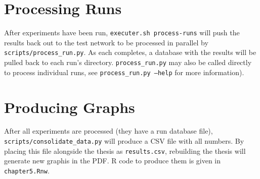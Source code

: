 \documentclass{article}
\begin{document}
\section{Processing Runs}
\par After experiments have been run, \texttt{executer.sh process-runs} will push the results back out to the test network to be processed in parallel by \texttt{scripts/process\_run.py}. As each completes, a database with the results will be pulled back to each run's directory. \texttt{process\_run.py} may also be called directly to process individual runs, see \texttt{process\_run.py --help} for more information).

\section{Producing Graphs}
\par After all experiments are processed (they have a run database file), \texttt{scripts/consolidate\_data.py} will produce a CSV file with all numbers. By placing this file alongside the thesis as \texttt{results.csv}, rebuilding the thesis will generate new graphis in the PDF. R code to produce them is given in \texttt{chapter5.Rnw}.
\end{document}
